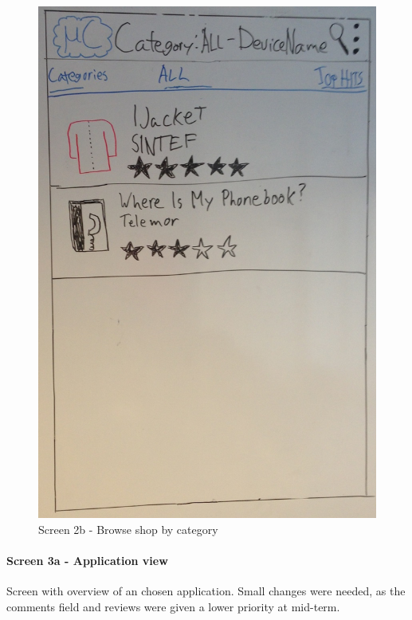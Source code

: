 \begin{figure}[H]
\centering
\includegraphics[scale=0.2]{images/Design_guide/Screen2b.png}
\caption{Screen 2b - Browse shop by category}
\label{fig:screen2b}
\end{figure}


\paragraph{Screen 3a - Application view}
Screen with overview of an chosen application. Small changes were needed, as the comments field and reviews were given a lower priority at mid-term.

